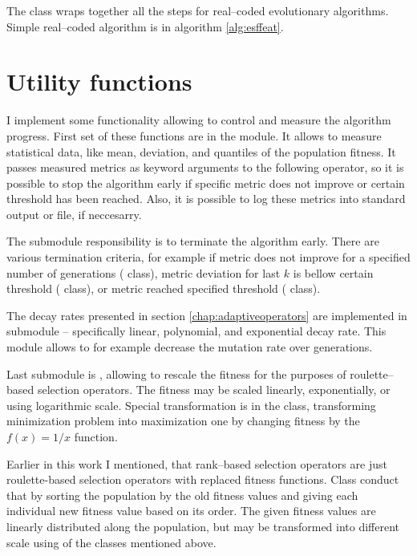 The  class wraps together all the steps for real--coded evolutionary algorithms. Simple real--coded algorithm is in algorithm \ref{alg:esffeat}.
    



\section{Utility functions}

I implement some functionality allowing to control and measure the algorithm progress. First set of these functions are in the  module. It allows to measure statistical data, like mean, deviation, and quantiles of the population fitness. It passes measured metrics as keyword arguments to the following operator, so it is possible to stop the algorithm early if specific metric does not improve or certain threshold has been reached. Also, it is possible to log these metrics into standard output or file, if neccesarry.

The  submodule responsibility is to terminate the algorithm early. There are various termination criteria, for example if metric does not improve for a specified number of generations ( class), metric deviation for last $k$ is bellow certain threshold ( class), or metric reached specified threshold ( class).

The decay rates presented in section \ref{chap:adaptiveoperators} are implemented in submodule  -- specifically linear, polynomial, and exponential decay rate. This module allows to for example decrease the mutation rate over generations.

Last submodule is , allowing to rescale the fitness for the purposes of roulette--based selection operators. The fitness may be scaled linearly, exponentially, or using logarithmic scale. Special transformation is in the  class, transforming minimization problem into maximization one by changing fitness by the $f(x)=1/x$ function.

Earlier in this work I mentioned, that rank--based selection operators are just roulette-based selection operators with replaced fitness functions. Class  conduct that by sorting the population by the old fitness values and giving each individual new fitness value based on its order. The given fitness values are linearly distributed along the population, but may be transformed into different scale using of the classes mentioned above.




